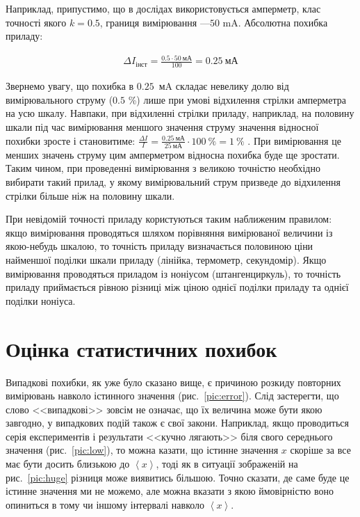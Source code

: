 \documentclass{LabBook}
\begin{document}
Наприклад, припустимо, що в дослідах використовується амперметр, клас точності якого  $k = 0.5$, границя вимірювання ---$  50 $ mA. Абсолютна похибка приладу:

\begin{align*}
 \Delta I_\text{інст} =  \frac{0.5 \cdot 50 \ \text{мА}}{100}=0.25\ \text{мА}
\end{align*}


\begin{Warning}
Звернемо увагу, що похибка в $ 0.25 $~мA складає невелику долю від вимірювального струму ($ 0.5 $ \%) лише при умові відхилення стрілки амперметра на усю шкалу. Навпаки, при відхиленні стрілки приладу, наприклад, на половину шкали під час вимірювання меншого значення струму значення відносної похибки зросте і становитиме: $\frac{{\Delta I}}{I} = \frac{0.25\ \text{мА}}{25\ \text{мА}} \cdot 100 \ \%  = 1\ \% $ . При вимірювання це менших значень струму цим амперметром відносна похибка буде ще зростати. Таким чином, при проведенні вимірювання з великою точністю необхідно вибирати такий прилад, у якому вимірювальний струм призведе до відхилення стрілки більше ніж на половину шкали.
\end{Warning}


При невідомій точності приладу користуються таким наближеним правилом: якщо вимірювання проводяться шляхом порівняння вимірюваної величини із якою-небудь шкалою, то точність приладу визначається половиною ціни найменшої поділки шкали приладу (лінійка, термометр, секундомір). Якщо вимірювання проводяться приладом із ноніусом (штангенциркуль), то точність приладу приймається рівною різниці між ціною однієї поділки приладу та однієї поділки ноніуса.



\section{Оцінка статистичних похибок}


Випадкові похибки, як уже було сказано вище, є причиною розкиду повторних вимірювань навколо істинного значення (рис.~\ref{pic:error}). Слід застерегти, що слово <<випадкові>> зовсім не означає, що  їх величина може бути якою завгодно, у випадкових подій також є свої закони. Наприклад, якщо прово\-дить\-ся серія експериментів і результати <<кучно лягають>> біля свого середнього значення (рис.~\ref{pic:low}), то можна казати, що істинне значення $x$ скоріше за все має бути досить близькою до  $\left\langle x \right\rangle$, тоді як в ситуації зображеній на рис.~\ref{pic:huge} різниця може виявитись більшою. Точно сказати, де саме буде це істинне значення ми не можемо, але можна вказати з якою ймовірністю воно опиниться в тому чи іншому інтервалі навколо $\left\langle x \right\rangle$.
\end{document}
